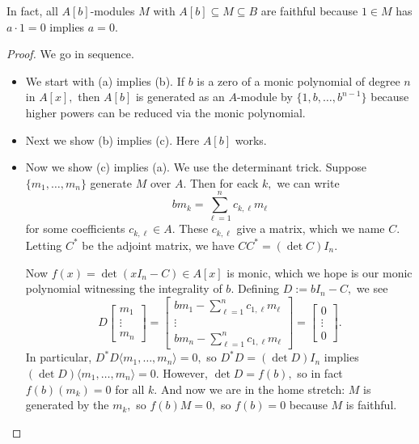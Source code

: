 \documentclass[../notes.tex]{subfiles}
\begin{document}
\begin{remark}
    In fact, all $A[b]$-modules $M$ with $A[b]\subseteq M\subseteq B$ are faithful because $1\in M$ has $a\cdot1=0$ implies $a=0.$
\end{remark}
\begin{proof}
    We go in sequence.
    \begin{itemize}
        \item We start with (a) implies (b). If $b$ is a zero of a monic polynomial of degree $n$ in $A[x],$ then $A[b]$ is generated as an $A$-module by $\{1,b,\ldots,b^{n-1}\}$ because higher powers can be reduced via the monic polynomial.
        
        \item Next we show (b) implies (c). Here $A[b]$ works.
        
        \item Now we show (c) implies (a). We use the determinant trick. Suppose $\{m_1,\ldots,m_n\}$ generate $M$ over $A.$ Then for eack $k,$ we can write
        \[bm_k=\sum_{\ell=1}^nc_{k,\ell}m_\ell\]
        for some coefficients $c_{k,\ell}\in A.$ These $c_{k,\ell}$ give a matrix, which we name $C.$ Letting $C^*$ be the adjoint matrix, we have $CC^*=(\det C)I_n.$
        
        Now $f(x)=\det(xI_n-C)\in A[x]$ is monic, which we hope is our monic polynomial witnessing the integrality of $b.$ Defining $D:=bI_n-C,$ we see
        \[D\begin{bmatrix}
            m_1 \\
            \vdots \\
            m_n
        \end{bmatrix}=\begin{bmatrix}
            bm_1-\sum_{\ell=1}^nc_{1,\ell}m_\ell \\
            \vdots \\
            bm_n-\sum_{\ell=1}^nc_{1,\ell}m_\ell
        \end{bmatrix}=\begin{bmatrix}
            0 \\
            \vdots \\
            0
        \end{bmatrix}.\]
        In particular, $D^*D\langle m_1,\ldots,m_n\rangle=0,$ so $D^*D=(\det D)I_n$ implies $(\det D)\langle m_1,\ldots,m_n\rangle=0.$ However, $\det D=f(b),$ so in fact $f(b)(m_k)=0$ for all $k.$ And now we are in the home stretch: $M$ is generated by the $m_k,$ so $f(b)M=0,$ so $f(b)=0$ because $M$ is faithful.
        \qedhere
    \end{itemize}
\end{proof}
\end{document}
